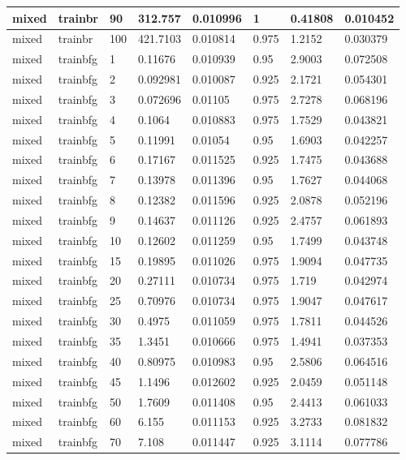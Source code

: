 \begin{longtable}{llllllll}
mixed & trainbr & 90 & 312.757 & 0.010996 & 1 & 0.41808 & 0.010452 \\ \hline 
mixed & trainbr & 100 & 421.7103 & 0.010814 & 0.975 & 1.2152 & 0.030379 \\ \hline 
mixed & trainbfg & 1 & 0.11676 & 0.010939 & 0.95 & 2.9003 & 0.072508 \\ \hline 
mixed & trainbfg & 2 & 0.092981 & 0.010087 & 0.925 & 2.1721 & 0.054301 \\ \hline 
mixed & trainbfg & 3 & 0.072696 & 0.01105 & 0.975 & 2.7278 & 0.068196 \\ \hline 
mixed & trainbfg & 4 & 0.1064 & 0.010883 & 0.975 & 1.7529 & 0.043821 \\ \hline 
mixed & trainbfg & 5 & 0.11991 & 0.01054 & 0.95 & 1.6903 & 0.042257 \\ \hline 
mixed & trainbfg & 6 & 0.17167 & 0.011525 & 0.925 & 1.7475 & 0.043688 \\ \hline 
mixed & trainbfg & 7 & 0.13978 & 0.011396 & 0.95 & 1.7627 & 0.044068 \\ \hline 
mixed & trainbfg & 8 & 0.12382 & 0.011596 & 0.925 & 2.0878 & 0.052196 \\ \hline 
mixed & trainbfg & 9 & 0.14637 & 0.011126 & 0.925 & 2.4757 & 0.061893 \\ \hline 
mixed & trainbfg & 10 & 0.12602 & 0.011259 & 0.95 & 1.7499 & 0.043748 \\ \hline 
mixed & trainbfg & 15 & 0.19895 & 0.011026 & 0.975 & 1.9094 & 0.047735 \\ \hline 
mixed & trainbfg & 20 & 0.27111 & 0.010734 & 0.975 & 1.719 & 0.042974 \\ \hline 
mixed & trainbfg & 25 & 0.70976 & 0.010734 & 0.975 & 1.9047 & 0.047617 \\ \hline 
mixed & trainbfg & 30 & 0.4975 & 0.011059 & 0.975 & 1.7811 & 0.044526 \\ \hline 
mixed & trainbfg & 35 & 1.3451 & 0.010666 & 0.975 & 1.4941 & 0.037353 \\ \hline 
mixed & trainbfg & 40 & 0.80975 & 0.010983 & 0.95 & 2.5806 & 0.064516 \\ \hline 
mixed & trainbfg & 45 & 1.1496 & 0.012602 & 0.925 & 2.0459 & 0.051148 \\ \hline 
mixed & trainbfg & 50 & 1.7609 & 0.011408 & 0.95 & 2.4413 & 0.061033 \\ \hline 
mixed & trainbfg & 60 & 6.155 & 0.011153 & 0.925 & 3.2733 & 0.081832 \\ \hline 
mixed & trainbfg & 70 & 7.108 & 0.011447 & 0.925 & 3.1114 & 0.077786 \\ \hline 

\end{longtable}
